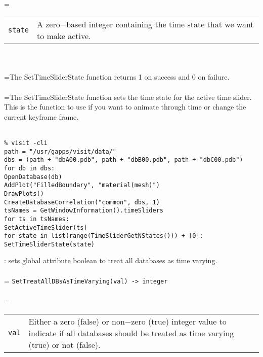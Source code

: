 \documentclass[10pt,a4paper]{report}
\begin{document}
 \\ 
\hangindent=\parindent 
\begin{tabular}{lp{9cm}}
\verb!state! & A zero$-$based integer containing the time state that we want to make active. \\
\end{tabular} \\[-2mm]


 \\ 
\hangindent=\parindent The SetTimeSliderState function returns 1 on success and 0 on failure. \\[-3mm] 

 \\ 
\hangindent=\parindent The SetTimeSliderState function sets the time state for the active time slider. This is the function to use if you want to animate through time or change the current keyframe frame. \\[-3mm] 

\\[-6mm]
\begin{verbatim}% visit -cli
path = "/usr/gapps/visit/data/"
dbs = (path + "dbA00.pdb", path + "dbB00.pdb", path + "dbC00.pdb")
for db in dbs:
OpenDatabase(db)
AddPlot("FilledBoundary", "material(mesh)")
DrawPlots()
CreateDatabaseCorrelation("common", dbs, 1)
tsNames = GetWindowInformation().timeSliders
for ts in tsNames:
SetActiveTimeSlider(ts)
for state in list(range(TimeSliderGetNStates())) + [0]:
SetTimeSliderState(state)
\end{verbatim}
\newpage


{}
: sets global attribute boolean to treat all databases as time varying.\\[-3mm]

 \\ 
\hangindent=\parindent 
\verb!SetTreatAllDBsAsTimeVarying(val) -> integer!\\ [-3mm]

 \\ 
\hangindent=\parindent 
\begin{tabular}{lp{9cm}}
\verb!val! & Either a zero (false) or non$-$zero (true) integer value to indicate if all databases should be treated as time varying (true) or not (false). \\
\end{tabular} \\[-2mm]
\end{document}
